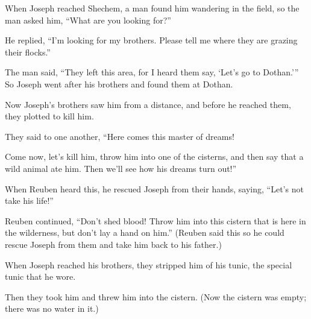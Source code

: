 \begin{scripture}
 When Joseph reached Shechem, a man found him wandering in the field, so the man asked him, ``What are you looking for?''
 He replied, ``I'm looking for my brothers. Please tell me where they are grazing their flocks.''
 The man said, ``They left this area, for I heard them say, `Let's go to Dothan.''' So Joseph went after his brothers and found them at Dothan.
\everypar{}

 Now Joseph's brothers saw him from a distance, and before he reached them, they plotted to kill him.
 They said to one another, ``Here comes this master of dreams!
 Come now, let's kill him, throw him into one of the cisterns, and then say that a wild animal ate him. Then we'll see how his dreams turn out!''
\everypar{}

 When Reuben heard this, he rescued Joseph from their hands, saying, ``Let's not take his life!''
 Reuben continued, ``Don't shed blood! Throw him into this cistern that is here in the wilderness, but don't lay a hand on him.'' (Reuben said this so he could rescue Joseph from them and take him back to his father.)
\everypar{}

 When Joseph reached his brothers, they stripped him of his tunic, the special tunic that he wore.
 Then they took him and threw him into the cistern. (Now the cistern was empty; there was no water in it.)
\everypar{}


\end{scripture}
